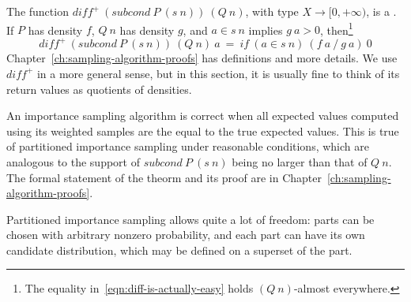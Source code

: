 The function $diff^+~(subcond~P~(s~n))~(Q~n)$, with type $X \to [0,+\infty)$, is a .
If $P$ has density $f$, $Q~n$ has density $g$, and $a \in s~n$ implies $g~a > 0$, then\footnote{The equality in~\eqref{eqn:diff-is-actually-easy} holds $(Q~n)$-almost everywhere.}
\begin{equation}
	diff^+~(subcond~P~(s~n))~(Q~n)~a\ =\ if~(a \in s~n)~(f~a~{/}~g~a)~0
\label{eqn:diff-is-actually-easy}
\end{equation}
Chapter~\ref{ch:sampling-algorithm-proofs} has definitions and more details.
We use $diff^+$ in a more general sense, but in this section, it is usually fine to think of its return values as quotients of densities.

An importance sampling algorithm is correct when all expected values computed using its weighted samples are the equal to the true expected values.
This is true of partitioned importance sampling under reasonable conditions, which are analogous to the support of $subcond~P~(s~n)$ being no larger than that of $Q~n$.
The formal statement of the theorm and its proof are in Chapter~\ref{ch:sampling-algorithm-proofs}.

Partitioned importance sampling allows quite a lot of freedom: parts can be chosen with arbitrary nonzero probability, and each part can have its own candidate distribution, which may be defined on a superset of the part.

